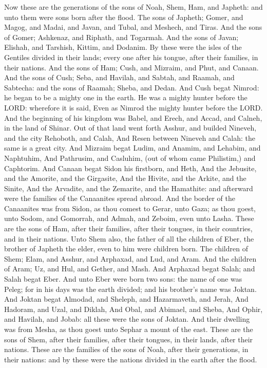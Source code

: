\begin{biblechapter} %
\verse Now these are the generations of the sons of Noah, Shem, Ham, and Japheth: and unto them were sons born after the flood.
\verse The sons of Japheth; Gomer, and Magog, and Madai, and Javan, and Tubal, and Meshech, and Tiras.
\verse And the sons of Gomer; Ashkenaz, and Riphath, and Togarmah.
\verse And the sons of Javan; Elishah, and Tarshish, Kittim, and Dodanim.
\verse By these were the isles of the Gentiles divided in their lands; every one after his tongue, after their families, in their nations.
\verse And the sons of Ham; Cush, and Mizraim, and Phut, and Canaan.
\verse And the sons of Cush; Seba, and Havilah, and Sabtah, and Raamah, and Sabtecha: and the sons of Raamah; Sheba, and Dedan.
\verse And Cush begat Nimrod: he began to be a mighty one in the earth.
\verse He was a mighty hunter before the LORD: wherefore it is said, Even as Nimrod the mighty hunter before the LORD.
\verse And the beginning of his kingdom was Babel, and Erech, and Accad, and Calneh, in the land of Shinar.
\verse Out of that land went forth Asshur, and builded Nineveh, and the city Rehoboth, and Calah,
\verse And Resen between Nineveh and Calah: the same is a great city.
\verse And Mizraim begat Ludim, and Anamim, and Lehabim, and Naphtuhim,
\verse And Pathrusim, and Casluhim, (out of whom came Philistim,) and Caphtorim.
\verse And Canaan begat Sidon his firstborn, and Heth,
\verse And the Jebusite, and the Amorite, and the Girgasite,
\verse And the Hivite, and the Arkite, and the Sinite,
\verse And the Arvadite, and the Zemarite, and the Hamathite: and afterward were the families of the Canaanites spread abroad.
\verse And the border of the Canaanites was from Sidon, as thou comest to Gerar, unto Gaza; as thou goest, unto Sodom, and Gomorrah, and Admah, and Zeboim, even unto Lasha.
\verse These are the sons of Ham, after their families, after their tongues, in their countries, and in their nations.
\verse Unto Shem also, the father of all the children of Eber, the brother of Japheth the elder, even to him were children born.
\verse The children of Shem; Elam, and Asshur, and Arphaxad, and Lud, and Aram.
\verse And the children of Aram; Uz, and Hul, and Gether, and Mash.
\verse And Arphaxad begat Salah; and Salah begat Eber.
\verse And unto Eber were born two sons: the name of one was Peleg; for in his days was the earth divided; and his brother's name was Joktan.
\verse And Joktan begat Almodad, and Sheleph, and Hazarmaveth, and Jerah,
\verse And Hadoram, and Uzal, and Diklah,
\verse And Obal, and Abimael, and Sheba,
\verse And Ophir, and Havilah, and Jobab: all these were the sons of Joktan.
\verse And their dwelling was from Mesha, as thou goest unto Sephar a mount of the east.
\verse These are the sons of Shem, after their families, after their tongues, in their lands, after their nations.
\verse These are the families of the sons of Noah, after their generations, in their nations: and by these were the nations divided in the earth after the flood.
\end{biblechapter}
